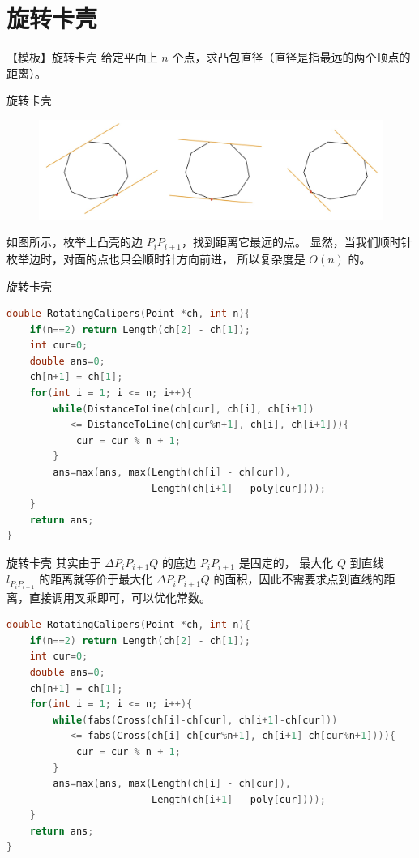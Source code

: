 \documentclass{beamer}
\begin{document}
\section{旋转卡壳}

\begin{frame}{【模板】旋转卡壳}
    \small
    给定平面上 $n$ 个点，求凸包直径（直径是指最远的两个顶点的距离）。
\end{frame}

\begin{frame}{旋转卡壳}
    \small
    \begin{figure}[H]
        \centering
        \includegraphics[width=\textwidth]{pic/rotation.jpg}
    \end{figure}
    如图所示，枚举上凸壳的边 $P_iP_{i+1}$，找到距离它最远的点。
    显然，当我们顺时针枚举边时，对面的点也只会顺时针方向前进，
    所以复杂度是 $O(n)$ 的。
\end{frame}

\begin{frame}[fragile]{旋转卡壳}
    \small
    \begin{lstlisting}[language=c++]
double RotatingCalipers(Point *ch, int n){
    if(n==2) return Length(ch[2] - ch[1]);
    int cur=0;
    double ans=0;
    ch[n+1] = ch[1];
    for(int i = 1; i <= n; i++){
        while(DistanceToLine(ch[cur], ch[i], ch[i+1]) 
           <= DistanceToLine(ch[cur%n+1], ch[i], ch[i+1])){
            cur = cur % n + 1;
        }
        ans=max(ans, max(Length(ch[i] - ch[cur]), 
                         Length(ch[i+1] - poly[cur])));
    }
    return ans;
}
    \end{lstlisting}
\end{frame}

\begin{frame}[fragile]{旋转卡壳}
    \footnotesize
    其实由于 $\Delta P_iP_{i+1}Q$ 的底边 $P_{i}P_{i+1}$ 是固定的，
    最大化 $Q$ 到直线 $l_{P_iP_{i+1}}$ 的距离就等价于最大化 $\Delta P_iP_{i+1}Q$
    的面积，因此不需要求点到直线的距离，直接调用叉乘即可，可以优化常数。
    \begin{lstlisting}[language=c++]
double RotatingCalipers(Point *ch, int n){
    if(n==2) return Length(ch[2] - ch[1]);
    int cur=0;
    double ans=0;
    ch[n+1] = ch[1];
    for(int i = 1; i <= n; i++){
        while(fabs(Cross(ch[i]-ch[cur], ch[i+1]-ch[cur])) 
           <= fabs(Cross(ch[i]-ch[cur%n+1], ch[i+1]-ch[cur%n+1]))){
            cur = cur % n + 1;
        }
        ans=max(ans, max(Length(ch[i] - ch[cur]), 
                         Length(ch[i+1] - poly[cur])));
    }
    return ans;
}
    \end{lstlisting}
\end{frame}
\end{document}
